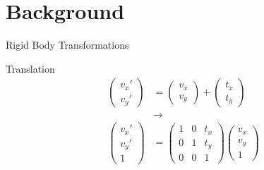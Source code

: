 \documentclass[presentation, aspectratio=1610]{beamer}
\begin{document}
\section{Background}
\label{sec:org69bdc7e}
\begin{frame}[label={sec:orgdaf5f31}]{Rigid Body Transformations}
\begin{block}{Translation}
\begin{equation*}
  \begin{aligned}
  \begin{pmatrix}
    v_{x}' \\ v_{y}'
  \end{pmatrix} &=
  \begin{pmatrix}
    v_{x} \\ v_{y}
  \end{pmatrix} +
  \begin{pmatrix}
    t_{x} \\ t_{y}
  \end{pmatrix} \\
                & \rightarrow \\
    \begin{pmatrix}
      v_{x}' \\ v_{y}' \\ 1
    \end{pmatrix} &=
                    \begin{pmatrix}
                      1 & 0 & t_{x} \\ 0 & 1 & t_{y} \\ 0 & 0 & 1
                    \end{pmatrix}
                                                                \begin{pmatrix}
                                                                  v_{x} \\ v_{y} \\  1
                                                                \end{pmatrix}
\end{aligned}
\end{equation*}
\end{block}
\end{frame}
\end{document}
